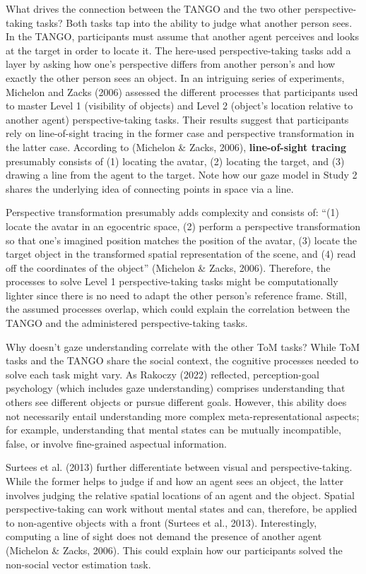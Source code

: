 \documentclass[
  man,mask,floatsintext]{apa6}
\begin{document}
What drives the connection between the TANGO and the two other perspective-taking tasks? Both tasks tap into the ability to judge what another person sees. In the TANGO, participants must assume that another agent perceives and looks at the target in order to locate it. The here-used perspective-taking tasks add a layer by asking how one's perspective differs from another person's and how exactly the other person sees an object. In an intriguing series of experiments, Michelon and Zacks (2006) assessed the different processes that participants used to master Level 1 (visibility of objects) and Level 2 (object's location relative to another agent) perspective-taking tasks. Their results suggest that participants rely on line-of-sight tracing in the former case and perspective transformation in the latter case. According to (Michelon \& Zacks, 2006), \textbf{line-of-sight tracing} presumably consists of (1) locating the avatar, (2) locating the target, and (3) drawing a line from the agent to the target. Note how our gaze model in Study 2 shares the underlying idea of connecting points in space via a line.

Perspective transformation presumably adds complexity and consists of: ``(1) locate the avatar in an egocentric space, (2) perform a perspective transformation so that one's imagined position matches the position of the avatar, (3) locate the target object in the transformed spatial representation of the scene, and (4) read off the coordinates of the object'' (Michelon \& Zacks, 2006). Therefore, the processes to solve Level 1 perspective-taking tasks might be computationally lighter since there is no need to adapt the other person's reference frame. Still, the assumed processes overlap, which could explain the correlation between the TANGO and the administered perspective-taking tasks.

Why doesn't gaze understanding correlate with the other ToM tasks? While ToM tasks and the TANGO share the social context, the cognitive processes needed to solve each task might vary. As Rakoczy (2022) reflected, perception-goal psychology (which includes gaze understanding) comprises understanding that others see different objects or pursue different goals. However, this ability does not necessarily entail understanding more complex meta-representational aspects; for example, understanding that mental states can be mutually incompatible, false, or involve fine-grained aspectual information.

Surtees et al. (2013) further differentiate between visual and perspective-taking. While the former helps to judge if and how an agent sees an object, the latter involves judging the relative spatial locations of an agent and the object. Spatial perspective-taking can work without mental states and can, therefore, be applied to non-agentive objects with a front (Surtees et al., 2013). Interestingly, computing a line of sight does not demand the presence of another agent (Michelon \& Zacks, 2006). This could explain how our participants solved the non-social vector estimation task.
\end{document}
